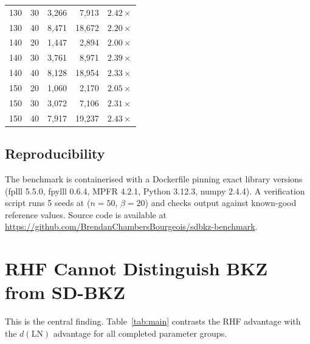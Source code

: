 \documentclass[journal=cic,version=preprint]{iacrj}
\begin{document}
\begin{table}[tbp]
\begin{tabular}{rrrrr}
130 & 30 & 3{,}266  & 7{,}913  & $2.42\times$ \\
130 & 40 & 8{,}471  & 18{,}672 & $2.20\times$ \\
140 & 20 & 1{,}447  & 2{,}894  & $2.00\times$ \\
140 & 30 & 3{,}761  & 8{,}971  & $2.39\times$ \\
140 & 40 & 8{,}128  & 18{,}954 & $2.33\times$ \\
150 & 20 & 1{,}060  & 2{,}170  & $2.05\times$ \\
150 & 30 & 3{,}072  & 7{,}106  & $2.31\times$ \\
150 & 40 & 7{,}917  & 19{,}237 & $2.43\times$ \\
\hline
\end{tabular}
\end{table}

\subsection{Reproducibility}

The benchmark is containerised with a Dockerfile pinning exact library versions (fplll 5.5.0, fpylll 0.6.4, MPFR 4.2.1, Python 3.12.3, numpy 2.4.4). A verification script runs 5 seeds at ($n=50$, $\beta=20$) and checks output against known-good reference values. Source code is available at \url{https://github.com/BrendanChambersBourgeois/sdbkz-benchmark}.

\section{RHF Cannot Distinguish BKZ from SD-BKZ}
\label{sec:rhf-blind}

This is the central finding. Table~\ref{tab:main} contrasts the RHF advantage with the $d(\mathrm{LN})$ advantage for all completed parameter groups.
\end{document}
